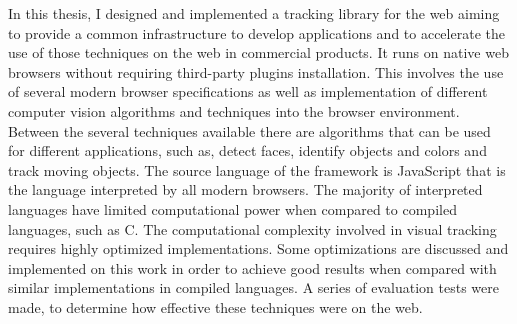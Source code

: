 In this thesis, I designed and implemented a tracking library for the web aiming to provide a common infrastructure to develop applications and to accelerate the use of those techniques on the web in commercial products. It runs on native web browsers without requiring third-party plugins installation. This involves the use of several modern browser specifications as well as implementation of different computer vision algorithms and techniques into the browser environment. Between the several techniques available there are algorithms that can be used for different applications, such as, detect faces, identify objects and colors and track moving objects. The source language of the framework is JavaScript that is the language interpreted by all modern browsers. The majority of interpreted languages have limited computational power when compared to compiled languages, such as C. The computational complexity involved in visual tracking requires highly optimized implementations. Some optimizations are discussed and implemented on this work in order to achieve good results when compared with similar implementations in compiled languages. A series of evaluation tests were made, to determine how effective these techniques were on the web.



